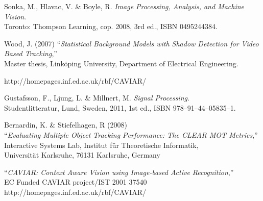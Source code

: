 \begin{thebibliography}{9}

	Sonka, M., Hlavac, V. \& Boyle, R. 
	\emph{Image Processing, Analysis, and Machine Vision}.\\
	Toronto: Thompson Learning,
	cop. 2008, 3rd ed.,
	ISBN 0495244384.
	
	Wood, J. (2007)
	``\textit{Statistical Background Models with Shadow Detection for Video Based Tracking},''\\
	Master thesis, Linköping University, Department of Electrical Engineering.
	
	http://homepages.inf.ed.ac.uk/rbf/CAVIAR/	

	Gustafsson, F., Ljung, L. \& Millnert, M.
	\emph{Signal Processing}.\\
	Studentlitteratur, Lund, Sweden,
	2011, 1st ed.,
	ISBN 978--91--44--05835--1.

	Bernardin, K. \& Stiefelhagen, R (2008)\\
	``\textit{Evaluating Multiple Object Tracking Performance: The CLEAR MOT Metrics},''\\
	Interactive Systems Lab, Institut für Theoretische Informatik,\\
	Universität Karlsruhe, 76131 Karlsruhe, Germany

	``\textit{CAVIAR: Context Aware Vision using Image-based Active Recognition},''\\
	EC Funded CAVIAR project/IST 2001 37540\\
	http://homepages.inf.ed.ac.uk/rbf/CAVIAR/
	


\end{thebibliography}